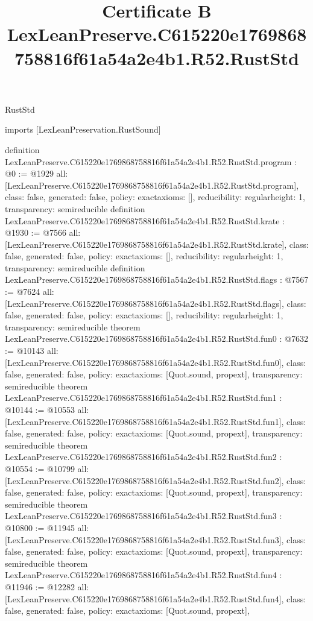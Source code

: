 \begin{lexlean}{RustStd}
\title{Certificate B LexLeanPreserve.C615220e1769868758816f61a54a2e4b1.R52.RustStd}
\begin{coremodule}
imports [LexLeanPreservation.RustSound]

definition LexLeanPreserve.C615220e1769868758816f61a54a2e4b1.R52.RustStd.program : @0 := @1929 {
  all: [LexLeanPreserve.C615220e1769868758816f61a54a2e4b1.R52.RustStd.program],
  class: false,
  generated: false,
  policy: exact{axioms: []},
  reducibility: regular{height: 1},
  transparency: semireducible
}
definition LexLeanPreserve.C615220e1769868758816f61a54a2e4b1.R52.RustStd.krate : @1930 := @7566 {
  all: [LexLeanPreserve.C615220e1769868758816f61a54a2e4b1.R52.RustStd.krate],
  class: false,
  generated: false,
  policy: exact{axioms: []},
  reducibility: regular{height: 1},
  transparency: semireducible
}
definition LexLeanPreserve.C615220e1769868758816f61a54a2e4b1.R52.RustStd.flags : @7567 := @7624 {
  all: [LexLeanPreserve.C615220e1769868758816f61a54a2e4b1.R52.RustStd.flags],
  class: false,
  generated: false,
  policy: exact{axioms: []},
  reducibility: regular{height: 1},
  transparency: semireducible
}
theorem LexLeanPreserve.C615220e1769868758816f61a54a2e4b1.R52.RustStd.fun0 : @7632 := @10143 {
  all: [LexLeanPreserve.C615220e1769868758816f61a54a2e4b1.R52.RustStd.fun0],
  class: false,
  generated: false,
  policy: exact{axioms: [Quot.sound, propext]},
  transparency: semireducible
}
theorem LexLeanPreserve.C615220e1769868758816f61a54a2e4b1.R52.RustStd.fun1 : @10144 := @10553 {
  all: [LexLeanPreserve.C615220e1769868758816f61a54a2e4b1.R52.RustStd.fun1],
  class: false,
  generated: false,
  policy: exact{axioms: [Quot.sound, propext]},
  transparency: semireducible
}
theorem LexLeanPreserve.C615220e1769868758816f61a54a2e4b1.R52.RustStd.fun2 : @10554 := @10799 {
  all: [LexLeanPreserve.C615220e1769868758816f61a54a2e4b1.R52.RustStd.fun2],
  class: false,
  generated: false,
  policy: exact{axioms: [Quot.sound, propext]},
  transparency: semireducible
}
theorem LexLeanPreserve.C615220e1769868758816f61a54a2e4b1.R52.RustStd.fun3 : @10800 := @11945 {
  all: [LexLeanPreserve.C615220e1769868758816f61a54a2e4b1.R52.RustStd.fun3],
  class: false,
  generated: false,
  policy: exact{axioms: [Quot.sound, propext]},
  transparency: semireducible
}
theorem LexLeanPreserve.C615220e1769868758816f61a54a2e4b1.R52.RustStd.fun4 : @11946 := @12282 {
  all: [LexLeanPreserve.C615220e1769868758816f61a54a2e4b1.R52.RustStd.fun4],
  class: false,
  generated: false,
  policy: exact{axioms: [Quot.sound, propext]},
}
\end{coremodule}
\end{lexlean}
